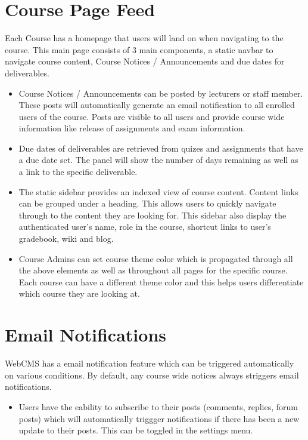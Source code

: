 \section{Course Page Feed}
Each Course has a homepage that users will land on when navigating to the course. This main page consists of 3 main components, a static navbar to navigate course content, Course Notices / Announcements and due dates for deliverables.
\begin{itemize}
\item Course Notices / Announcements can be posted by lecturers or staff member. These posts will automatically generate an email notification to all enrolled users of the course. Posts are visible to all users and provide course wide information like release of assignments and exam information.
\item Due dates of deliverables are retrieved from quizes and assignments that have a due date set. The panel will show the number of days remaining as well as a link to the specific deliverable.
\item The static sidebar provides an indexed view of course content. Content links can be grouped under a heading. This allows users to quickly navigate through to the content they are looking for. This sidebar also display the authenticated user's name, role in the course, shortcut links to user's gradebook, wiki and blog.
\item Course Admins can set course theme color which is propagated through all the above elements as well as throughout all pages for the specific course. Each course can have a different theme color and this helps users differentiate which course they are looking at.
\end{itemize}

\section{Email Notifications}
WebCMS has a email notification feature which can be triggered automatically on various conditions. By default, any course wide notices always striggers email notifications.
\begin{itemize}
\item Users have the eability to subscribe to their posts (comments, replies, forum posts) which will automatically triggger notifications if there has been a new update to their posts. This can be toggled in the settings menu.
\end{itemize}


